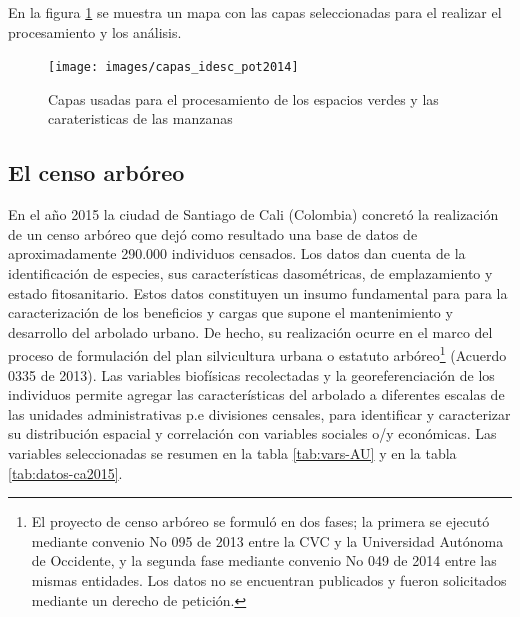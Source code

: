 \documentclass[12pt,]{book}
\let\rmarkdownfootnote\footnote%
\def\footnote{\protect\rmarkdownfootnote}
\begin{document}
En la figura \ref{fig:capas-idesc} se muestra un mapa con las capas
seleccionadas para el realizar el procesamiento y los análisis.

\begin{figure}
\texttt{[image: images/capas\_idesc\_pot2014]} \caption{Capas usadas para el procesamiento de los espacios verdes y las carateristicas de las manzanas}\label{fig:capas-idesc}
\end{figure}

\subsection{El censo arbóreo}\label{el-censo-arboreo}

En el año 2015 la ciudad de Santiago de Cali (Colombia) concretó la
realización de un censo arbóreo que dejó como resultado una base de
datos de aproximadamente 290.000 individuos censados. Los datos dan
cuenta de la identificación de especies, sus características
dasométricas, de emplazamiento y estado fitosanitario. Estos datos
constituyen un insumo fundamental para para la caracterización de los
beneficios y cargas que supone el mantenimiento y desarrollo del
arbolado urbano. De hecho, su realización ocurre en el marco del proceso
de formulación del plan silvicultura urbana o estatuto arbóreo\footnote{El
  proyecto de censo arbóreo se formuló en dos fases; la primera se
  ejecutó mediante convenio No 095 de 2013 entre la CVC y la Universidad
  Autónoma de Occidente, y la segunda fase mediante convenio No 049 de
  2014 entre las mismas entidades. Los datos no se encuentran publicados
  y fueron solicitados mediante un derecho de petición.} (Acuerdo 0335
de 2013). Las variables biofísicas recolectadas y la georeferenciación
de los individuos permite agregar las características del arbolado a
diferentes escalas de las unidades administrativas p.e divisiones
censales, para identificar y caracterizar su distribución espacial y
correlación con variables sociales o/y económicas. Las variables
seleccionadas se resumen en la tabla \ref{tab:vars-AU} y en la tabla
\ref{tab:datos-ca2015}.
\end{document}
